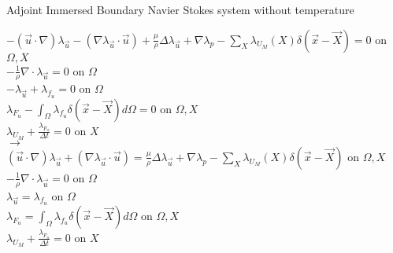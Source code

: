 \documentclass[10pt]{article} %
\begin{document}
\begin{center}
\begin{flushleft}
	Adjoint Immersed Boundary Navier Stokes system without temperature
\end{flushleft}
	$-(\vec{u}\cdot\nabla) \lambda_{\vec{u}} - \left(\nabla \lambda_{\vec{u}} \cdot \vec{u}\right) + \frac{\mu}{\rho} \Delta \lambda_{\vec{u}} + \nabla\lambda_p - \sum_X \lambda_{U_M}(X) \delta(\vec{x}-\vec{X}) = 0$ \quad on $\Omega,X$\\
	$-\frac{1}{\rho} \nabla \cdot \lambda_{\vec{u}} = 0$ \quad on $\Omega$\\
	$-\lambda_{\vec{u}} + \lambda_{f_u} = 0$ \quad on $\Omega$\\
	$\lambda_{F_u} - \int_{\Omega} \lambda_{f_u} \delta (\vec{x}-\vec{X}) d\Omega = 0$ \quad on $\Omega,X$\\
	$\lambda_{U_M} + \frac{\lambda_{F_u}}{\Delta t}=0$ \quad on $X$\\
	$\rightarrow$\\
	$(\vec{u}\cdot\nabla) \lambda_{\vec{u}} + \left(\nabla \lambda_{\vec{u}} \cdot \vec{u}\right) = \frac{\mu}{\rho} \Delta \lambda_{\vec{u}} + \nabla\lambda_p - \sum_X \lambda_{U_M}(X) \delta(\vec{x}-\vec{X})$ \quad on $\Omega,X$\\
	$-\frac{1}{\rho} \nabla \cdot \lambda_{\vec{u}} = 0$ \quad on $\Omega$\\
	$\lambda_{\vec{u}} = \lambda_{f_u} $ \quad on $\Omega$\\
	$\lambda_{F_u} = \int_{\Omega} \lambda_{f_u} \delta (\vec{x}-\vec{X}) d\Omega$ \quad on $\Omega,X$\\
	$\lambda_{U_M} + \frac{\lambda_{F_u}}{\Delta t}=0$ \quad on $X$\\
\end{center}
\newpage
\end{document}
